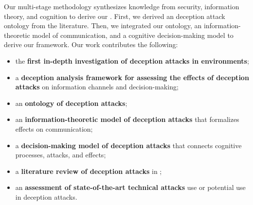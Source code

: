Our multi-stage methodology synthesizes knowledge from \MR security, information theory, and cognition to derive our \MR \DAF. 
First, we derived an \MR deception attack ontology from the literature. %
Then, we integrated our ontology, an information-theoretic model of communication, and a cognitive decision-making model to derive our framework. 
Our work contributes the following:

\begin{itemize}
\itemsep0em
    \item the \textbf{first in-depth investigation of deception attacks in \MR environments}; 
    \item a \textbf{deception analysis framework for assessing the effects of \MR deception attacks} on information channels and decision-making;
    \item an \textbf{ontology of \MR deception attacks};
    \item an \textbf{information-theoretic model of \MR deception attacks} that formalizes effects on communication;
    \item a \textbf{decision-making model of \MR deception attacks} that connects cognitive processes, attacks, and effects;
    \item a \textbf{literature review of deception attacks} in \MR;
    \item an \textbf{assessment of state-of-the-art \MR technical attacks} use or potential use in deception attacks.
\end{itemize}

